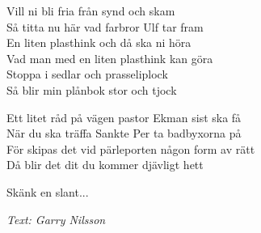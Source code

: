 \vspace{10pt}
Vill ni bli fria från synd och skam\\
Så titta nu här vad farbror Ulf tar fram\\
En liten plasthink och då ska ni höra\\
Vad man med en liten plasthink kan göra\\
Stoppa i sedlar och prasseliplock\\
Så blir min plånbok stor och tjock\par
\vspace{10pt}
Ett litet råd på vägen pastor Ekman sist ska få\\
När du ska träffa Sankte Per ta badbyxorna på\\
För skipas det vid pärleporten någon form av rätt\\
Då blir det dit du kommer djävligt hett\par
\vspace{10pt}
Skänk en slant...\par
\vspace{10pt}
{\footnotesize\textit{Text: Garry Nilsson}}
